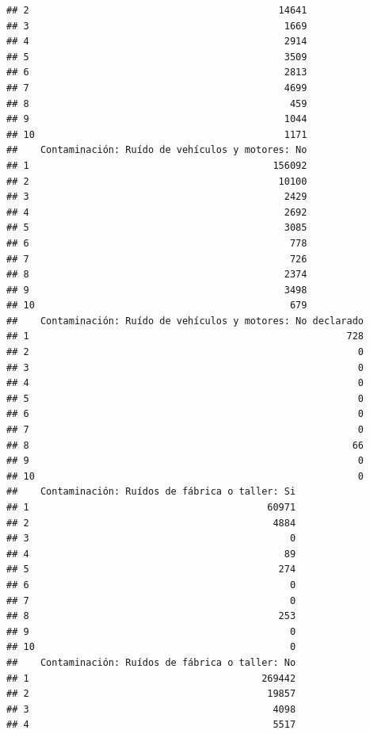 \documentclass[11pt,]{article}
\begin{document}
\begin{verbatim}
## 2                                            14641
## 3                                             1669
## 4                                             2914
## 5                                             3509
## 6                                             2813
## 7                                             4699
## 8                                              459
## 9                                             1044
## 10                                            1171
##    Contaminación: Ruído de vehículos y motores: No
## 1                                           156092
## 2                                            10100
## 3                                             2429
## 4                                             2692
## 5                                             3085
## 6                                              778
## 7                                              726
## 8                                             2374
## 9                                             3498
## 10                                             679
##    Contaminación: Ruído de vehículos y motores: No declarado
## 1                                                        728
## 2                                                          0
## 3                                                          0
## 4                                                          0
## 5                                                          0
## 6                                                          0
## 7                                                          0
## 8                                                         66
## 9                                                          0
## 10                                                         0
##    Contaminación: Ruídos de fábrica o taller: Si
## 1                                          60971
## 2                                           4884
## 3                                              0
## 4                                             89
## 5                                            274
## 6                                              0
## 7                                              0
## 8                                            253
## 9                                              0
## 10                                             0
##    Contaminación: Ruídos de fábrica o taller: No
## 1                                         269442
## 2                                          19857
## 3                                           4098
## 4                                           5517

\end{verbatim}
\end{document}
